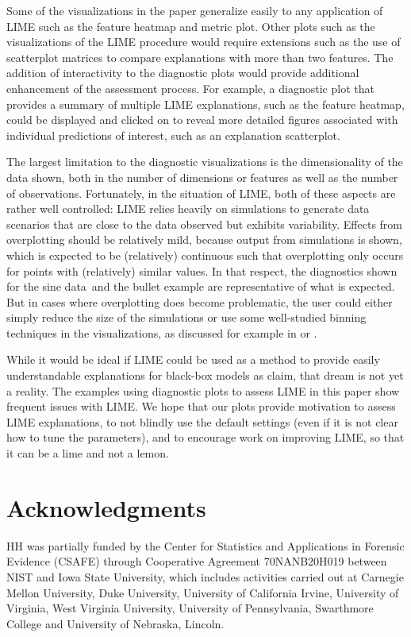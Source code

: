 \documentclass[AMS,STIX2COL]{WileyNJD-v2}\usepackage[]{graphicx}\usepackage[]{color}
\newcommand{\data}{sine data}
\begin{document}
Some of the visualizations in the paper generalize easily to any application of LIME such as the feature heatmap and metric plot. Other plots such as the visualizations of the LIME procedure would require extensions such as the use of scatterplot matrices to compare explanations with more than two features. The addition of interactivity to the diagnostic plots would provide additional enhancement of the assessment process. For example, a diagnostic plot that provides a summary of multiple LIME explanations, such as the feature heatmap, could be displayed and clicked on to reveal more detailed figures associated with individual predictions of interest, such as an explanation scatterplot.

The largest limitation to the diagnostic visualizations is the dimensionality of the data shown, both in the number of dimensions or features as well as the number of observations. Fortunately, in the situation of LIME, both of these aspects are rather well controlled: LIME relies heavily on simulations to generate data scenarios that are close to the data observed but exhibits variability. Effects from overplotting should be relatively mild, because output from simulations is shown, which is expected to be (relatively) continuous such that overplotting only occurs for points with (relatively) similar values. In that respect, the diagnostics shown for the \data \ and the bullet example are representative of what is expected. But in cases where overplotting does become problematic, the user could either simply reduce the size of the simulations or use some well-studied binning techniques in the visualizations, as discussed for example in \citet{carr:1987} or \citet{unwin:2006}. 

While it would be ideal if LIME could be used as a method to provide easily understandable explanations for black-box models as \citet{ribeiro:2016} claim, that dream is not yet a reality. The examples using diagnostic plots to assess LIME in this paper show frequent issues with LIME. We hope that our plots provide motivation to assess LIME explanations, to not blindly use the default settings (even if it is not clear how to tune the parameters), and to encourage work on improving LIME, so that it can be a lime and not a lemon.

\section*{Acknowledgments}

HH was partially funded by the Center for Statistics and Applications in Forensic Evidence (CSAFE) through Cooperative Agreement 70NANB20H019 between NIST and Iowa State University, which includes activities carried out at Carnegie Mellon University, Duke University, University of California Irvine, University of Virginia, West Virginia University, University of Pennsylvania, Swarthmore College and University of Nebraska, Lincoln.
\end{document}
